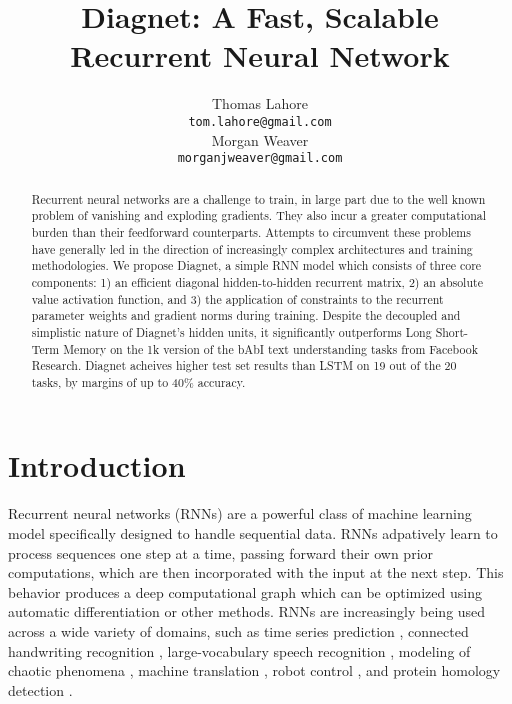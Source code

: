 \documentclass{article}
\title{Diagnet: A Fast, Scalable Recurrent Neural Network}
\author{
Thomas Lahore\\
\texttt{tom.lahore@gmail.com}\\
\And
Morgan Weaver\\
\texttt{morganjweaver@gmail.com}
}
\begin{document}
\maketitle
\begin{abstract}

Recurrent neural networks are a challenge to train, in large part due to the well known problem of vanishing and exploding gradients. They also incur a greater computational burden than their feedforward counterparts. Attempts to circumvent these problems have generally led in the direction of increasingly complex architectures and training methodologies. We propose Diagnet, a simple RNN model which consists of three core components: 1) an efficient diagonal hidden-to-hidden recurrent matrix, 2) an absolute value activation function, and 3) the application of constraints to the recurrent parameter weights and gradient norms during training. Despite the decoupled and simplistic nature of Diagnet's hidden units, it significantly outperforms Long Short-Term Memory on the 1k version of the bAbI text understanding tasks from Facebook Research. Diagnet acheives higher test set results than LSTM on 19 out of the 20 tasks, by margins of up to 40\% accuracy.
  

\end{abstract}

\section{Introduction}

Recurrent neural networks (RNNs) are a powerful class of machine learning model specifically designed to handle sequential data. RNNs adpatively learn to process sequences one step at a time, passing forward their own prior computations, which are then incorporated with the input at the next step. This behavior produces a deep computational graph which can be optimized using automatic differentiation or other methods. RNNs are increasingly being used across a wide variety of domains, such as time series prediction \citep{Giles2001}, connected handwriting recognition \citep{graves2009offline}, large-vocabulary speech recognition \citep{SakSB14}, modeling of chaotic phenomena \citep{PhysRevLett.120.024102}, machine translation \citep{bahdanau2014neural, mikolov2010recurrent}, robot control \citep{oubbati2005kinematic}, and protein homology detection \citep{el2008predicting}.
\end{document}
